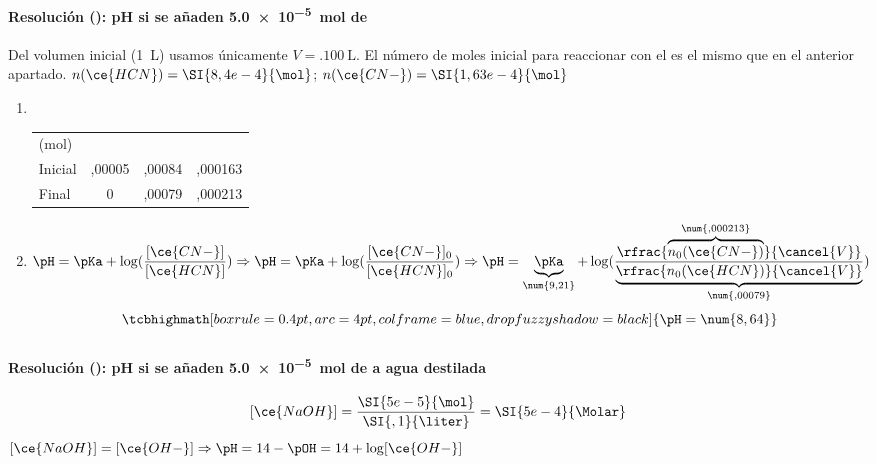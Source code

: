 \begin{frame}
	\frametitle{\ejerciciocmd}
	\framesubtitle{Resolución (): pH si se añaden \SI{5,0e-5}{\mol} de }
	Del volumen inicial (\SI{1}{\liter}) usamos únicamente $V=\SI{,100}{\liter}$. El número de moles inicial para reaccionar con el  es el mismo que en el anterior apartado.
	$n(\ce{HCN}) = \SI{8,4e-4}{\mol}$; $n(\ce{CN-}) = \SI{1,63e-4}{\mol}$
	\begin{enumerate}[label={Paso \arabic*},font=\bfseries]
		\item{}
		\begin{center}
			\\[.15cm]
			\begin{tabular}{lSSS}
				\toprule
					(mol) 	& {} 	& {} 	& {} 	\\
					Inicial &  ,00005		& ,00084		& ,000163 		\\
					Final	&  0			& ,00079		& ,000213		\\
				\bottomrule
			\end{tabular}
		\end{center}
		\item{} 
		$$
			\pH = \pKa + \log(\frac{[\ce{CN-}]}{[\ce{HCN}]})\Rightarrow
			\pH = \pKa + \log(\frac{[\ce{CN-}]_0}{[\ce{HCN}]_0})\Rightarrow
			\pH = \underbrace{\pKa}_{\num{9,21}} +
			\log(\frac{\rfrac{\overbrace{n_0(\ce{CN-})}^{\num{,000213}}}{\cancel{V}}}{\underbrace{\rfrac{n_0(\ce{HCN})}{\cancel{V}}}_{\num{,00079}}})
		$$
		$$
			\tcbhighmath[boxrule=0.4pt,arc=4pt,colframe=blue,drop fuzzy shadow=black]{\pH = \num{8,64}}
		$$
	\end{enumerate}
\end{frame}

\begin{frame}
	\frametitle{\ejerciciocmd}
	\framesubtitle{Resolución (): pH si se añaden \SI{5,0e-5}{\mol} de  a agua destilada}
	$$
		[\ce{NaOH}] = \frac{\SI{5e-5}{\mol}}{\SI{,1}{\liter}} = \SI{5e-4}{\Molar}
	$$
	 $[\ce{NaOH}] = [\ce{OH-}]\Rightarrow \pH = 14-\pOH = 14+\log[\ce{OH-}]$
	\begin{center}
	\end{center}
\end{frame}

